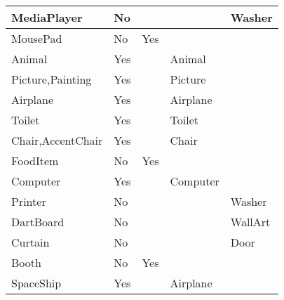 \documentclass{article}
\begin{document}
\begin{longtable}{|l|l|l|l|l|}
MediaPlayer                              & No               &                                &                & Washer                      \\ \hline
MousePad                                 & No               & Yes                            &                &                             \\ \hline
Animal                                   & Yes              &                                & Animal         &                             \\ \hline
Picture,Painting                         & Yes              &                                & Picture        &                             \\ \hline
Airplane                                 & Yes              &                                & Airplane       &                             \\ \hline
Toilet                                   & Yes              &                                & Toilet         &                             \\ \hline
Chair,AccentChair                        & Yes              &                                & Chair          &                             \\ \hline
FoodItem                                 & No               & Yes                            &                &                             \\ \hline
Computer                                 & Yes              &                                & Computer       &                             \\ \hline
Printer                                  & No               &                                &                & Washer                      \\ \hline
DartBoard                                & No               &                                &                & WallArt                     \\ \hline
Curtain                                  & No               &                                &                & Door                        \\ \hline
Booth                                    & No               & Yes                            &                &                             \\ \hline
SpaceShip                                & Yes              &                                & Airplane       &                             \\ \hline

\end{longtable}
\end{document}
